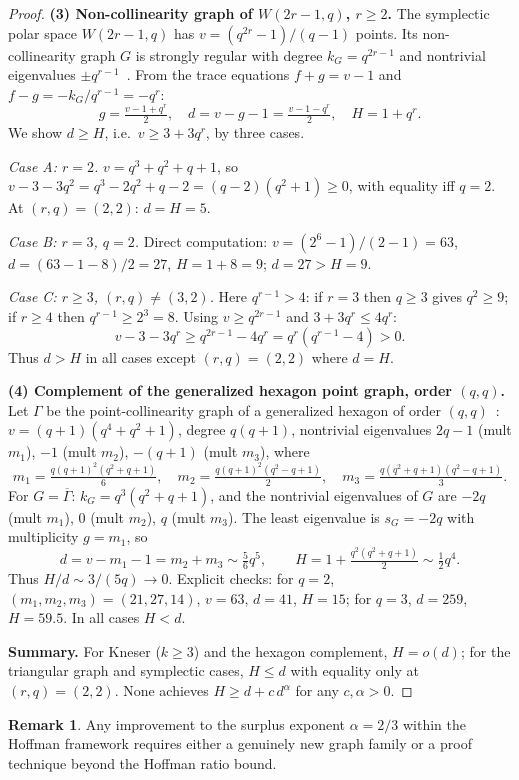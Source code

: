 \documentclass{article}
\theoremstyle{definition}
\newtheorem{remark}[theorem]{Remark}
\begin{document}
\begin{proof}
\textbf{(3) Non-collinearity graph of $W(2r-1,q)$, $r\ge 2$.}
The symplectic polar space $W(2r-1,q)$ has $v=(q^{2r}-1)/(q-1)$ points.  Its non-collinearity graph $G$ is strongly regular with degree $k_G=q^{2r-1}$ and nontrivial eigenvalues $\pm q^{r-1}$~\cite{BvM2022}.  From the trace equations $f+g=v-1$ and $f-g=-k_G/q^{r-1}=-q^r$:
\[
  g = \tfrac{v-1+q^r}{2},\quad d = v-g-1 = \tfrac{v-1-q^r}{2},\quad
  H = 1 + q^r.
\]
We show $d\ge H$, i.e.\ $v\ge 3+3q^r$, by three cases.

\textit{Case A: $r=2$.}
$v = q^3+q^2+q+1$, so $v-3-3q^2 = q^3-2q^2+q-2 = (q-2)(q^2+1)\ge 0$,
with equality iff $q=2$.  At $(r,q)=(2,2)$: $d=H=5$.

\textit{Case B: $r=3$, $q=2$.}
Direct computation: $v=(2^6-1)/(2-1)=63$, $d=(63-1-8)/2=27$, $H=1+8=9$; $d=27 > H=9$.

\textit{Case C: $r\ge 3$, $(r,q)\ne(3,2)$.}
Here $q^{r-1}>4$: if $r=3$ then $q\ge 3$ gives $q^2\ge 9$; if $r\ge 4$ then $q^{r-1}\ge 2^3=8$.  Using $v\ge q^{2r-1}$ and $3+3q^r\le 4q^r$:
\[
  v-3-3q^r \ge q^{2r-1}-4q^r = q^r(q^{r-1}-4) > 0.
\]
Thus $d > H$ in all cases except $(r,q)=(2,2)$ where $d=H$.

\textbf{(4) Complement of the generalized hexagon point graph, order $(q,q)$.}
Let $\Gamma$ be the point-collinearity graph of a generalized hexagon of order $(q,q)$~\cite{BvM2022}: $v=(q+1)(q^4+q^2+1)$, degree $q(q+1)$, nontrivial eigenvalues $2q-1$ (mult $m_1$), $-1$ (mult $m_2$), $-(q+1)$ (mult $m_3$), where
\[
  m_1 = \tfrac{q(q+1)^2(q^2+q+1)}{6},\quad
  m_2 = \tfrac{q(q+1)^2(q^2-q+1)}{2},\quad
  m_3 = \tfrac{q(q^2+q+1)(q^2-q+1)}{3}.
\]
For $G=\overline{\Gamma}$: $k_G = q^3(q^2+q+1)$, and the nontrivial eigenvalues of $G$ are $-2q$ (mult $m_1$), $0$ (mult $m_2$), $q$ (mult $m_3$).  The least eigenvalue is $s_G=-2q$ with multiplicity $g=m_1$, so
\[
  d = v - m_1 - 1 = m_2 + m_3 \sim \tfrac56q^5,
  \qquad
  H = 1 + \tfrac{q^2(q^2+q+1)}{2} \sim \tfrac12q^4.
\]
Thus $H/d \sim 3/(5q)\to 0$.  Explicit checks: for $q=2$, $(m_1,m_2,m_3)=(21,27,14)$, $v=63$, $d=41$, $H=15$; for $q=3$, $d=259$, $H=59.5$.  In all cases $H < d$.

\medskip
\textbf{Summary.}  For Kneser ($k\ge 3$) and the hexagon complement, $H=o(d)$; for the triangular graph and symplectic cases, $H\le d$ with equality only at $(r,q)=(2,2)$.  None achieves $H\ge d+c\,d^\alpha$ for any $c,\alpha>0$.
\end{proof}

\begin{remark}
Any improvement to the surplus exponent $\alpha=2/3$ within the Hoffman framework requires either a genuinely new graph family or a proof technique beyond the Hoffman ratio bound.
\end{remark}
\end{document}
